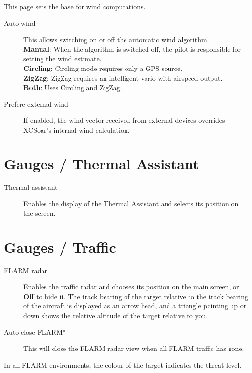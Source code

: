 This page sets the base for wind computations.

\begin{description}
\item[Auto wind]  \label{conf:autowind} This allows switching on or off the
  automatic wind algorithm. \\
  {\bf Manual}: When the algorithm is switched off, the pilot is responsible for
  setting the wind estimate. \\
  {\bf Circling}: Circling mode requires only a GPS source. \\
  {\bf ZigZag}: ZigZag requires an intelligent vario with airspeed output. \\
  {\bf Both}:  Uses Circling and ZigZag.
\item[Prefere external wind]  If enabled, the wind vector received from external
  devices overrides XCSoar's internal wind calculation.
\end{description}


\section{Gauges / Thermal Assistant}

\begin{description}
\item[Thermal assistant] \label{conf:thermalassistant} Enables the display of the
  Thermal Assistant and selects its position on the screen.
\end{description}


\section{Gauges / Traffic} \label{sec:flarmandother-gauge}

\begin{description}
\item[FLARM radar]  \label{conf:flarmdisplay}\label{conf:flarmradar-place} Enables the traffic radar and
  chooses its position on the main screen, or {\bf Off} to hide it.
  The track bearing of the target relative to the track bearing of the 
  aircraft is displayed as an arrow head, and a triangle pointing up or down shows 
  the relative altitude of the target relative to you.
\\
\item[Auto close FLARM*]  This will close the FLARM radar view when all FLARM 
  traffic has gone.
\end{description}
In all FLARM environments, the colour of the target indicates the threat level.


